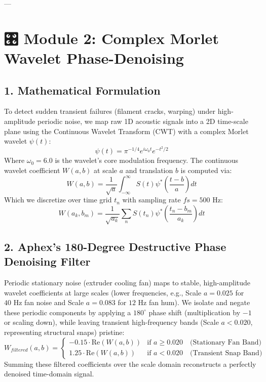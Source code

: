 \documentclass[11pt,twocolumn]{article}
\begin{document}
---

\section{🎛️ Module 2: Complex Morlet Wavelet Phase-Denoising}

\subsection{1. Mathematical Formulation}
To detect sudden transient failures (filament cracks, warping) under high-amplitude periodic noise, we map raw 1D acoustic signals into a 2D time-scale plane using the Continuous Wavelet Transform (CWT) with a complex Morlet wavelet $\psi(t)$:
$$\psi(t) = \pi^{-1/4} e^{i \omega_0 t} e^{-t^2/2}$$
Where $\omega_0 = 6.0$ is the wavelet's core modulation frequency. The continuous wavelet coefficient $W(a, b)$ at scale $a$ and translation $b$ is computed via:
$$W(a, b) = \frac{1}{\sqrt{a}} \int_{-\infty}^{\infty} S(t) \psi^*\left(\frac{t-b}{a}\right) dt$$
Which we discretize over time grid $t_n$ with sampling rate $fs = 500\text{ Hz}$:
$$W(a_k, b_m) = \frac{1}{\sqrt{a_k}} \sum_{n} S(t_n) \psi^*\left(\frac{t_n - b_m}{a_k}\right) dt$$

\subsection{2. Aphex's 180-Degree Destructive Phase Denoising Filter}
Periodic stationary noise (extruder cooling fan) maps to stable, high-amplitude wavelet coefficients at large scales (lower frequencies, e.g., Scale $a = 0.025$ for $40\text{ Hz}$ fan noise and Scale $a = 0.083$ for $12\text{ Hz}$ fan hum). We isolate and negate these periodic components by applying a $180^\circ$ phase shift (multiplication by $-1$ or scaling down), while leaving transient high-frequency bands (Scale $a < 0.020$, representing structural snaps) pristine:
$$W_{filtered}(a, b) = 
\begin{cases} 
-0.15 \cdot \text{Re}(W(a, b)) & \text{if } a \ge 0.020 \quad \text{(Stationary Fan Band)} \\
1.25 \cdot \text{Re}(W(a, b)) & \text{if } a < 0.020 \quad \text{(Transient Snap Band)}
\end{cases}$$
Summing these filtered coefficients over the scale domain reconstructs a perfectly denoised time-domain signal.
\end{document}
